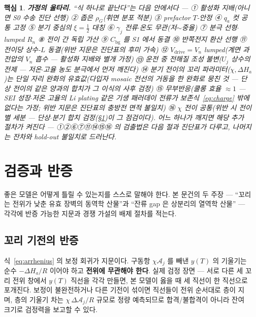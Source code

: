 \documentclass[11pt,a4paper]{article}
\newtheorem*{keybox}{핵심}
\newcommand{\drive}{\mathrm{drive}}
\newcommand{\bg}{\mathrm{bg}}
\begin{document}
\begin{keybox}
\textbf{가정의 울타리.} ``식 하나로 끝난다''는 다음 안에서다 — ① 활성화 지배(아니면 S0 수송 진단 선행)
② 좁은 $\rho_G$(휘면 분포 적분) ③ prefactor $T$-안정 ④ $q_a$ 컷 공통 고정 ⑤ 분기 중심의
$\xi=\tfrac12$ 대칭 ⑥ $\gamma_j$ 전류$\cdot$온도 무관(저$\sim$중율) ⑦ 분극 선형$\cdot$lumped
$R_n$ ⑧ 전이 간 독립 가산 ⑨ $C_\bg$ 를 S1 에서 동결 ⑩ 반쪽전지 환산 선행 ⑪ 전이당 상수-$L$
동결(위반 지문은 진단표의 후미 가속) ⑫ $V_\drive=V_n$ lumped(계면 과전압의 $V_n$ 흡수 — 활성화
지배와 별개 가정) ⑬ 운전 중 전해질 조성 불변($U_j$ 상수의 전제 — 저온$\cdot$고율 농도 분극에서 먼저
깨진다) ⑭ 분기 전이의 꼬리 파라미터($\chi,\Delta H_a$)는 단일 자리 완화의 \emph{유효값}(다입자
mosaic 전선의 거동을 한 완화로 뭉친 것 — 단상 전이의 같은 양과의 합치가 그 이식의 사후 검정)
⑮ 무부반응(쿨롱 효율 $\approx1$ — SEI 성장$\cdot$저온 고율의 Li plating 같은 기생 패러데이 전류가
보존식~\eqref{eq:charge} 밖에 없다는 가정; 위반 지문은 진단표의 충방전 면적 불일치)
⑯ $\chi$ 전이 공통(위반 시 전이별 세분 — 단상$\cdot$분기 합치 검정(\S\ref{sec:falsify})이 그
점검이다). 어느 하나가 깨지면 해당 추가 절차가 켜진다 — ①②⑥⑦⑪⑭⑮⑯ 의 검출법은 다음 절과
진단표가 다루고, 나머지는 잔차와 hold-out 불일치로 드러난다.
\end{keybox}

\section{검증과 반증}\label{sec:falsify}
좋은 모델은 어떻게 틀릴 수 있는지를 스스로 말해야 한다. 본 문건의 두 주장 — ``꼬리는 전위가 낮춘 유효
장벽의 동역학 산물''과 ``잔류 gap 은 상분리의 열역학 산물'' — 각각에 반증 가능한 지문과 경쟁 가설의 배제
절차를 적는다.

\subsection{꼬리 기전의 반증}
식~\eqref{eq:arrhenius} 의 보정 회귀가 지문이다. 구동항 $\chi\mathcal A_j$ 를 빼낸 $y(T)$ 의 기울기는
순수 $-\Delta H_a/R$ 이어야 하고 \textbf{전위에 무관해야 한다}. 실제 검정 장면 — 서로 다른 세 꼬리 전위
창에서 $y(T)$ 직선을 각각 만들면, 본 모델이 옳을 때 세 직선이 한 직선으로 포개진다. 보정이 불완전하거나
다른 기전이 섞이면 직선들이 전위 순서대로 층이 지며, 층의 기울기 차는 $\chi\,\Delta\mathcal A_j/R$
규모로 정량 예측되므로 합격/불합격이 아니라 잔여 크기로 검정력을 보고할 수 있다.
\end{document}
